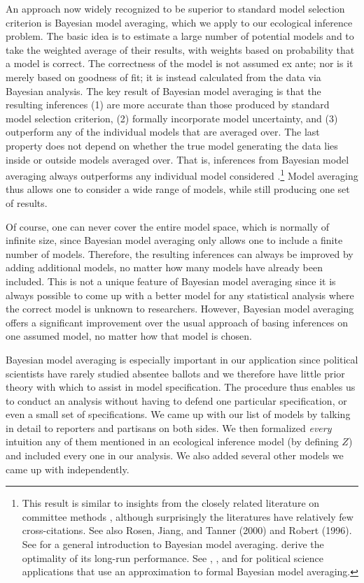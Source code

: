 \documentclass[11pt,titlepage]{article}
\begin{document}
An approach now widely recognized to be superior to standard model
selection criterion is Bayesian model averaging, which we apply to our
ecological inference problem.  The basic idea is to estimate a large
number of potential models and to take the weighted average of their
results, with weights based on probability that a model is correct.
The correctness of the model is not assumed ex ante; nor is it merely
based on goodness of fit; it is instead calculated from the data via
Bayesian analysis.  The key result of Bayesian model averaging is that
the resulting inferences (1) are more accurate than those produced by
standard model selection criterion, (2) formally incorporate model
uncertainty, and (3) outperform any of the individual models that are
averaged over.  The last property does not depend on whether the true
model generating the data lies inside or outside models averaged over.
That is, inferences from Bayesian model averaging always outperforms
any individual model considered
\citep[e.g.,][]{madi:raft:94}.\footnote{This result is similar to
  insights from the closely related literature on committee methods
  \citep{bish:95}, although surprisingly the literatures have
  relatively few cross-citations.  See also Rosen, Jiang, and Tanner
  (2000) and Robert (1996)\nocite{rose:jian:tann:00,robe:96a}.  See
  \citet{hoet:madi:raft:voli:99} for a general introduction to
  Bayesian model averaging.  \citet{raft:zhen:03} derive the
  optimality of its long-run performance. See \citet{bart:97},
  \citet{BarZal01}, and \citet{EriBafWil02} for political science
  applications that use an approximation to formal Bayesian model
  averaging.} Model averaging thus allows one to consider a wide range
of models, while still producing one set of results.

Of course, one can never cover the entire model space, which is
normally of infinite size, since Bayesian model averaging only allows
one to include a finite number of models.  Therefore, the resulting
inferences can always be improved by adding additional models, no
matter how many models have already been included.  This is not a
unique feature of Bayesian model averaging since it is always possible
to come up with a better model for any statistical analysis where the
correct model is unknown to researchers.  However, Bayesian model
averaging offers a significant improvement over the usual approach of
basing inferences on one assumed model, no matter how that model is
chosen.

Bayesian model averaging is especially important in our application
since political scientists have rarely studied absentee ballots and we
therefore have little prior theory with which to assist in model
specification.  The procedure thus enables us to conduct an analysis
without having to defend one particular specification, or even a small
set of specifications.  We came up with our list of models by talking
in detail to reporters and partisans on both sides.  We then
formalized \emph{every} intuition any of them mentioned in an
ecological inference model (by defining $Z$) and included every one in
our analysis.  We also added several other models we came up with
independently.
\end{document}

